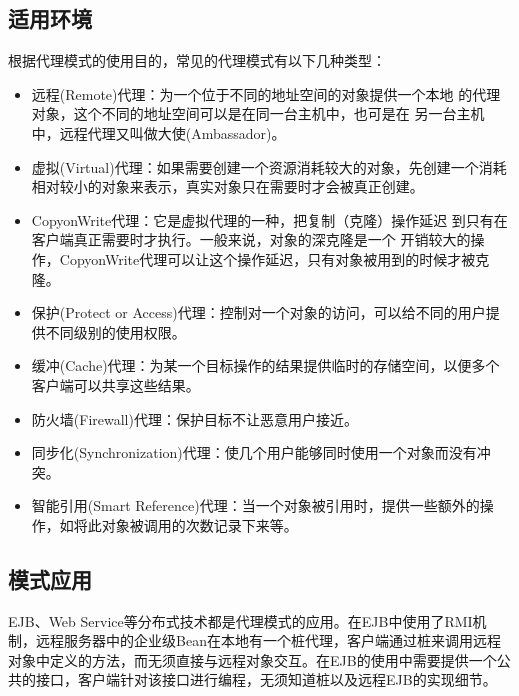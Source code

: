 \documentclass[letterpaper,10pt,english]{sphinxmanual}
\begin{document}
\subsection{适用环境}
\label{\detokenize{structural_patterns/proxy:id12}}
\sphinxAtStartPar
根据代理模式的使用目的，常见的代理模式有以下几种类型：
\begin{itemize}
\item {} 
\sphinxAtStartPar
远程(Remote)代理：为一个位于不同的地址空间的对象提供一个本地 的代理对象，这个不同的地址空间可以是在同一台主机中，也可是在 另一台主机中，远程代理又叫做大使(Ambassador)。

\item {} 
\sphinxAtStartPar
虚拟(Virtual)代理：如果需要创建一个资源消耗较大的对象，先创建一个消耗相对较小的对象来表示，真实对象只在需要时才会被真正创建。

\item {} 
\sphinxAtStartPar
Copy\sphinxhyphen{}on\sphinxhyphen{}Write代理：它是虚拟代理的一种，把复制（克隆）操作延迟 到只有在客户端真正需要时才执行。一般来说，对象的深克隆是一个 开销较大的操作，Copy\sphinxhyphen{}on\sphinxhyphen{}Write代理可以让这个操作延迟，只有对象被用到的时候才被克隆。

\item {} 
\sphinxAtStartPar
保护(Protect or Access)代理：控制对一个对象的访问，可以给不同的用户提供不同级别的使用权限。

\item {} 
\sphinxAtStartPar
缓冲(Cache)代理：为某一个目标操作的结果提供临时的存储空间，以便多个客户端可以共享这些结果。

\item {} 
\sphinxAtStartPar
防火墙(Firewall)代理：保护目标不让恶意用户接近。

\item {} 
\sphinxAtStartPar
同步化(Synchronization)代理：使几个用户能够同时使用一个对象而没有冲突。

\item {} 
\sphinxAtStartPar
智能引用(Smart Reference)代理：当一个对象被引用时，提供一些额外的操作，如将此对象被调用的次数记录下来等。

\end{itemize}


\subsection{模式应用}
\label{\detokenize{structural_patterns/proxy:id13}}
\sphinxAtStartPar
EJB、Web Service等分布式技术都是代理模式的应用。在EJB中使用了RMI机制，远程服务器中的企业级Bean在本地有一个桩代理，客户端通过桩来调用远程对象中定义的方法，而无须直接与远程对象交互。在EJB的使用中需要提供一个公共的接口，客户端针对该接口进行编程，无须知道桩以及远程EJB的实现细节。
\end{document}
